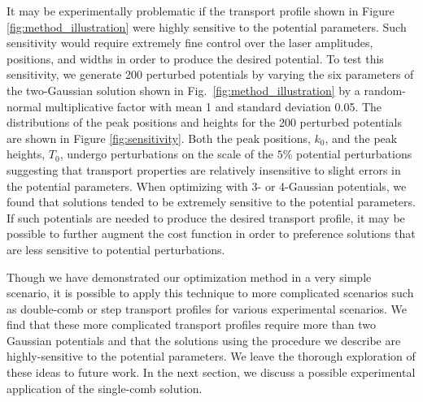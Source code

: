 \documentclass[twocolumn,amsmath,amssymb,showpacs,prl,superscriptaddress,aps]{revtex4-1}
\begin{document}
It may be experimentally problematic if the transport profile shown in Figure \ref{fig:method_illustration} were highly sensitive to the potential parameters. Such sensitivity would require extremely fine control over the laser amplitudes, positions, and widths in order to produce the desired potential. To test this sensitivity, we generate 200 perturbed potentials by varying the six parameters of the two-Gaussian solution shown in Fig.~\ref{fig:method_illustration} by a random-normal multiplicative factor with mean 1 and standard deviation 0.05. The distributions of the peak positions and heights for the 200 perturbed potentials are shown in Figure \ref{fig:sensitivity}. Both the peak positions, $k_0$, and the peak heights, $T_0$, undergo perturbations on the scale of the $5\%$  potential perturbations suggesting that transport properties are relatively insensitive to slight errors in the potential parameters. When optimizing with 3- or 4-Gaussian potentials, we found that solutions tended to be extremely sensitive to the potential parameters. If such potentials are needed to produce the desired transport profile, it may be possible to further augment the cost function in order to preference solutions that are less sensitive to potential perturbations.

Though we have demonstrated our optimization method in a very simple scenario, it is possible to apply this technique to more complicated scenarios such as double-comb or step transport profiles for various experimental scenarios. We find that these more complicated transport profiles require more than two Gaussian potentials and that the solutions using the procedure we describe are highly-sensitive to the potential parameters. We leave the thorough exploration of these ideas to future work. In the next section, we discuss a possible experimental application of the single-comb solution. 
\end{document}
